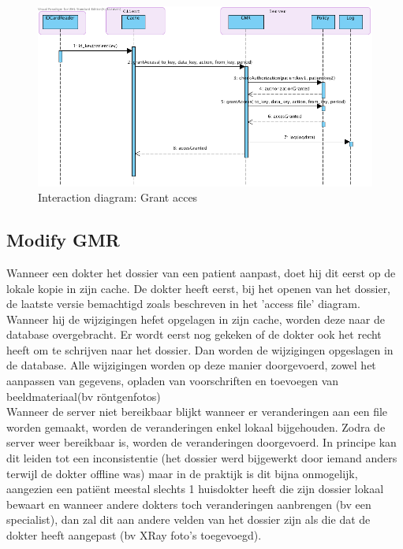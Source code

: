 \documentclass[a4paper,10pt]{article}
\begin{document}
\begin{figure}[!h]
  \includegraphics[width=\textwidth]{../images/grantAccess.png}
  \caption{Interaction diagram: Grant acces}
\end{figure}

\subsection{Modify GMR}
\label{interaction:modifyGMR}
Wanneer een dokter het dossier van een patient aanpast, doet hij dit eerst op de lokale kopie in zijn cache. De dokter heeft eerst, bij het openen van het dossier, de laatste versie bemachtigd zoals beschreven in het 'access file' diagram. Wanneer hij de wijzigingen hefet opgelagen in zijn cache, worden deze naar de database overgebracht. Er wordt eerst nog gekeken of de dokter ook het recht heeft om te schrijven naar het dossier. Dan worden de wijzigingen opgeslagen in de database. Alle wijzigingen worden op deze manier doorgevoerd, zowel het aanpassen van gegevens, opladen van voorschriften en toevoegen van beeldmateriaal(bv röntgenfotos)\\
Wanneer de server niet bereikbaar blijkt wanneer er veranderingen aan een file worden gemaakt, worden de veranderingen enkel lokaal bijgehouden. Zodra de server weer bereikbaar is, worden de veranderingen doorgevoerd. In principe kan dit leiden tot een inconsistentie (het dossier werd bijgewerkt door iemand anders terwijl de dokter offline was) maar in de praktijk is dit bijna onmogelijk, aangezien een patiënt meestal slechts 1 huisdokter heeft die zijn dossier lokaal bewaart en wanneer andere dokters toch veranderingen aanbrengen (bv een specialist), dan zal dit aan andere velden van het dossier zijn als die dat de dokter heeft aangepast (bv XRay foto's toegevoegd). 
\end{document}
